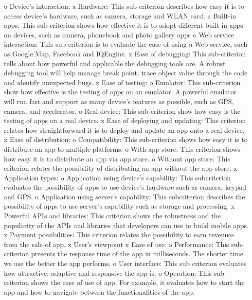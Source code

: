 \begin{itemize}
            o Device’s interaction:
                a Hardware: This sub-criterion describes how easy it is to access device’s hardware, such as camera, storage and WLAN card.
                a Built-in apps: This sub-criterion shows how effective it is to adopt different built-in apps on devices, such as camera, phonebook and photo gallery apps
            o Web service interaction: This sub-criterion is to evaluate the ease of using a Web service, such as Google Map, Facebook and IQEngine.
        x Ease of debugging: This sub-criterion tells about how powerful and applicable the debugging tools are. A robust debugging tool will help manage break point, trace object value through the code and identify unexpected bugs.
        x Ease of testing:
            o Emulator: This sub-criterion show how effective is the testing of apps on an emulator. A powerful emulator will run fast and support as many device’s features as possible, such as GPS, camera, and accelerator.
            o Real device: This sub-criterion show how easy is the testing of apps on a real device.
        x Ease of deploying and updating: This criterion relates how straightforward it is to deploy and update an app onto a real device.
        x Ease of distribution:
            o Compatibility: This sub-criterion shows how easy it is to distribute an app to multiple platforms.
            o With app store: This criterion shows how easy it is to distribute an app via app store.
            o Without app store: This criterion relates the possibility of distributing an app without the app store. 
        x Application types:
         o Application using device’s capability: This subcriterion evaluates the possibility of apps to use device’s hardware such as camera, keypad and GPS.
            o Application using server’s capability: This subcriterion describes the possibility of apps to use server’s capability such as storage and processing.
        x Powerful APIs and libraries: This criterion shows the robustness and the popularity of the APIs and libraries that developers can use to build mobile apps.
        x Payment possibilities: This criterion relates the possibility to earn revenues from the sale of app.
        x User’s viewpoint
        x Ease of use:
            o Performance: This sub-criterion presents the response time of the app in milliseconds. The shorter time we use the better the app performs.
            o User interface: This sub criterion evaluates how attractive, adaptive and responsive the app is.
            o Operation: This sub-criterion shows the ease of use of app. For example, it evaluates how to start the app and how to navigate between the functionalities of the app.

\end{itemize}
